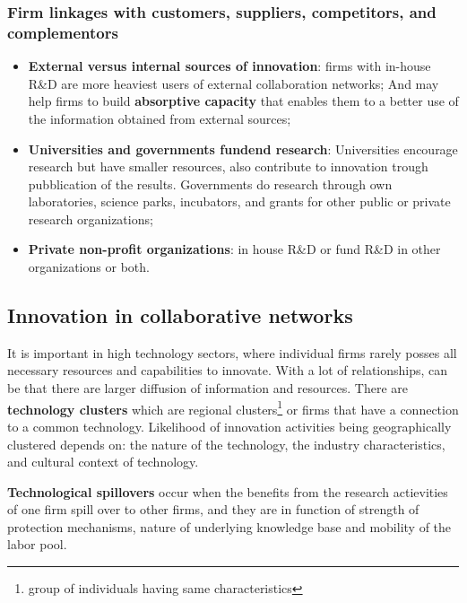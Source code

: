 \documentclass[12pt]{article}
\begin{document}
\subsubsection{Firm linkages with customers, suppliers, competitors, and complementors}
\begin{itemize}
    \item \textbf{External versus internal sources of innovation}: firms with in-house R\&D are more heaviest users of external collaboration networks;
    And may help firms to build \textbf{absorptive capacity} that enables them to a better use of the information obtained from external sources;
    \item \textbf{Universities and governments fundend research}: Universities encourage research but have smaller resources, also contribute to innovation trough pubblication of the results.
    Governments do research through own laboratories, science parks, incubators, and grants for other public or private research organizations;
    \item \textbf{Private non-profit organizations}: in house R\&D or fund R\&D in other organizations or both.
\end{itemize}
\subsection{Innovation in collaborative networks}
It is important in high technology sectors, where individual firms rarely posses all necessary resources and capabilities to innovate.
With a lot of relationships, can be that there are larger diffusion of information and resources.
There are \textbf{technology clusters} which are regional clusters\footnote{group of individuals having same characteristics} or firms that have a connection to a common technology.
Likelihood of innovation activities being geographically clustered depends on: the nature of the technology, the industry characteristics,  and cultural context of technology.

\textbf{Technological spillovers} occur when the benefits from the research actievities of one firm spill over to other firms, and they are in function of
strength of protection mechanisms, nature of underlying knowledge base and mobility of the labor pool.
\end{document}
